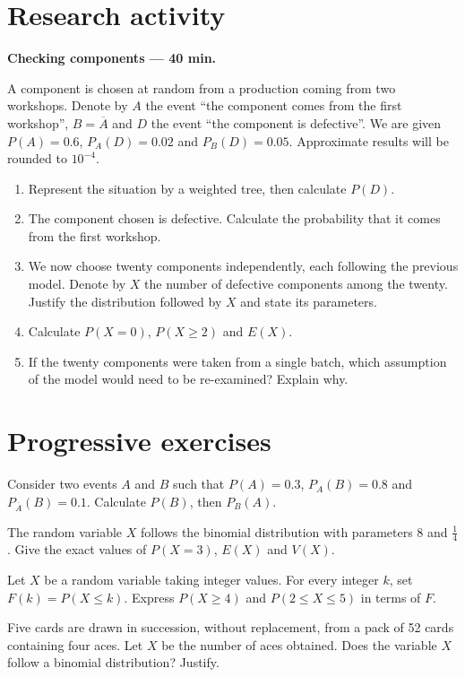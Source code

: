 \section{Research activity}\textbf{Checking components --- 40 min.}\par A component is chosen at random from a production coming from two workshops. Denote by $A$ the event ``the component comes from the first workshop'', $B=\overline A$ and $D$ the event ``the component is defective''. We are given $P(A)=0.6$, $P_A(D)=0.02$ and $P_B(D)=0.05$. Approximate results will be rounded to $10^{-4}$.
\begin{enumerate}\item Represent the situation by a weighted tree, then calculate $P(D)$.
\item The component chosen is defective. Calculate the probability that it comes from the first workshop.
\item We now choose twenty components independently, each following the previous model. Denote by $X$ the number of defective components among the twenty. Justify the distribution followed by $X$ and state its parameters.
\item Calculate $P(X=0)$, $P(X\ge2)$ and $E(X)$.
\item If the twenty components were taken from a single batch, which assumption of the model would need to be re-examined? Explain why.\end{enumerate}

\section{Progressive exercises}

Consider two events $A$ and $B$ such that $P(A)=0.3$, $P_A(B)=0.8$ and $P_{\overline A}(B)=0.1$. Calculate $P(B)$, then $P_B(A)$.

The random variable $X$ follows the binomial distribution with parameters $8$ and $\frac14$. Give the exact values of $P(X=3)$, $E(X)$ and $V(X)$.

Let $X$ be a random variable taking integer values. For every integer $k$, set $F(k)=P(X\le k)$. Express $P(X\ge4)$ and $P(2\le X\le5)$ in terms of $F$.

Five cards are drawn in succession, without replacement, from a pack of 52 cards containing four aces. Let $X$ be the number of aces obtained. Does the variable $X$ follow a binomial distribution? Justify.


